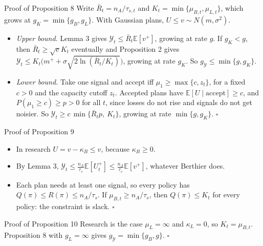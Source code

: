 \documentclass[aspectratio=169,11pt,t]{beamer}
\newcommand{\E}{\mathbb{E}}
\newcommand{\Ycal}{\mathcal{Y}}
\begin{document}
\begin{frame}{Proof of Proposition 8}
  Write $\bar R_t=n_A/\tau_{s,t}$ and $K_t=\min\{\mu_{B,t},\mu_{L,t}\}$, which grows at $g_K=\min\{g_B,g_L\}$. With Gaussian plans, $U\le v\sim N(m,\sigma^2)$.
  \begin{itemize}\setlength{\itemsep}{4pt}
    \item \emph{Upper bound.} Lemma 3 gives $\Ycal_t\le\bar R_t\E[v^+]$, growing at rate $g$. If $g_K<g$, then $\bar R_t\ge\sqrt e K_t$ eventually and Proposition 2 gives $\Ycal_t\le K_t\big(m^++\sigma\sqrt{2\ln(\bar R_t/K_t)}\big)$, growing at rate $g_K$. So $g_{\Ycal}\le\min\{g,g_K\}$.
    \item \emph{Lower bound.} Take one signal and accept iff $\mu_1\ge\max\{c,z_t\}$, for a fixed $c>0$ and the capacity cutoff $z_t$. Accepted plans have $\E[U\mid\text{accept}]\ge c$, and $P(\mu_1\ge c)\ge p>0$ for all $t$, since losses do not rise and signals do not get noisier. So $\Ycal_t\ge c\,\min\{\bar R_tp,\ K_t\}$, growing at rate $\min\{g,g_K\}$. \hfill$\square$
  \end{itemize}
\end{frame}

\begin{frame}{Proof of Proposition 9}
  \begin{itemize}\setlength{\itemsep}{8pt}
    \item In research $U=v-\kappa_B\le v$, because $\kappa_B\ge0$.
    \item By Lemma 3, $\Ycal_t\le\frac{n_A}{\tau_s}\E[U_t^+]\le\frac{n_A}{\tau_s}\E[v^+]$, whatever Berthier does.
    \item Each plan needs at least one signal, so every policy has $Q(\pi)\le R(\pi)\le n_A/\tau_s$. If $\mu_{B,t}\ge n_A/\tau_s$, then $Q(\pi)\le K_t$ for every policy: the constraint is slack. \hfill$\square$
  \end{itemize}
\end{frame}

\begin{frame}{Proof of Proposition 10}
  Research is the case $\mu_L=\infty$ and $\kappa_L=0$, so $K_t=\mu_{B,t}$. Proposition 8 with $g_L=\infty$ gives $g_{\Ycal}=\min\{g_B,g\}$. \hfill$\square$
\end{frame}
\end{document}
